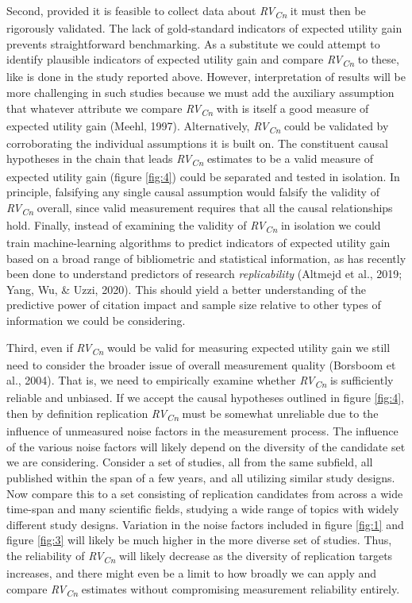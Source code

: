 \documentclass[
  english,
  man,floatsintext]{apa6}
\begin{document}
Second, provided it is feasible to collect data about \emph{RV\textsubscript{Cn}} it must then be rigorously validated. The lack of gold-standard indicators of expected utility gain prevents straightforward benchmarking. As a substitute we could attempt to identify plausible indicators of expected utility gain and compare \emph{RV\textsubscript{Cn}} to these, like is done in the study reported above. However, interpretation of results will be more challenging in such studies because we must add the auxiliary assumption that whatever attribute we compare \emph{RV\textsubscript{Cn}} with is itself a good measure of expected utility gain (Meehl, 1997). Alternatively, \emph{RV\textsubscript{Cn}} could be validated by corroborating the individual assumptions it is built on. The constituent causal hypotheses in the chain that leads \emph{RV\textsubscript{Cn}} estimates to be a valid measure of expected utility gain (figure \ref{fig:4}) could be separated and tested in isolation. In principle, falsifying any single causal assumption would falsify the validity of \emph{RV\textsubscript{Cn}} overall, since valid measurement requires that all the causal relationships hold. Finally, instead of examining the validity of \emph{RV\textsubscript{Cn}} in isolation we could train machine-learning algorithms to predict indicators of expected utility gain based on a broad range of bibliometric and statistical information, as has recently been done to understand predictors of research \emph{replicability} (Altmejd et al., 2019; Yang, Wu, \& Uzzi, 2020). This should yield a better understanding of the predictive power of citation impact and sample size relative to other types of information we could be considering.

Third, even if \emph{RV\textsubscript{Cn}} would be valid for measuring expected utility gain we still need to consider the broader issue of overall measurement quality (Borsboom et al., 2004). That is, we need to empirically examine whether \emph{RV\textsubscript{Cn}} is sufficiently reliable and unbiased. If we accept the causal hypotheses outlined in figure \ref{fig:4}, then by definition replication \emph{RV\textsubscript{Cn}} must be somewhat unreliable due to the influence of unmeasured noise factors in the measurement process. The influence of the various noise factors will likely depend on the diversity of the candidate set we are considering. Consider a set of studies, all from the same subfield, all published within the span of a few years, and all utilizing similar study designs. Now compare this to a set consisting of replication candidates from across a wide time-span and many scientific fields, studying a wide range of topics with widely different study designs. Variation in the noise factors included in figure \ref{fig:1} and figure \ref{fig:3} will likely be much higher in the more diverse set of studies. Thus, the reliability of \emph{RV\textsubscript{Cn}} will likely decrease as the diversity of replication targets increases, and there might even be a limit to how broadly we can apply and compare \emph{RV\textsubscript{Cn}} estimates without compromising measurement reliability entirely.
\end{document}
